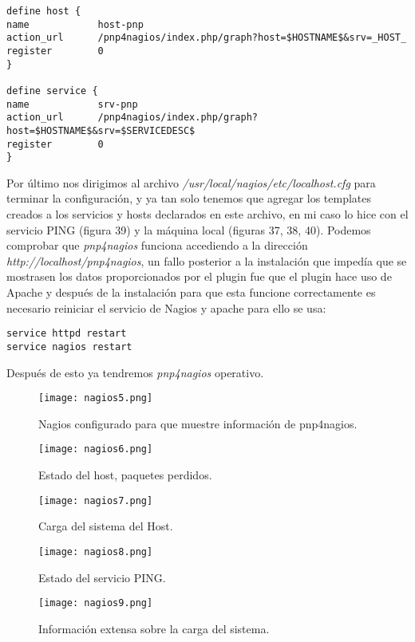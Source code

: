 \documentclass[a4paper, 11pt]{article} %
\begin{document}
\begin{verbatim}
define host {
name            host-pnp
action_url      /pnp4nagios/index.php/graph?host=$HOSTNAME$&srv=_HOST_
register        0
}

define service {
name            srv-pnp
action_url      /pnp4nagios/index.php/graph?host=$HOSTNAME$&srv=$SERVICEDESC$
register        0
}
\end{verbatim}
Por último nos dirigimos al archivo \textit{/usr/local/nagios/etc/localhost.cfg} para terminar la configuración, y ya tan solo tenemos que agregar los templates creados a los servicios y hosts declarados en este archivo, en mi caso lo hice con el servicio PING (figura 39) y la máquina local (figuras 37, 38, 40). Podemos comprobar que \textit{pnp4nagios} funciona accediendo a la dirección \textit{http://localhost/pnp4nagios}, un fallo posterior a la instalación que impedía que se mostrasen los datos proporcionados por el plugin fue que el plugin hace uso de Apache y después de la instalación para que esta funcione correctamente es necesario reiniciar el servicio de Nagios y apache para ello se usa:
\begin{verbatim}
service httpd restart
service nagios restart
\end{verbatim}
Después de esto ya tendremos \textit{pnp4nagios} operativo.
\begin{figure}[H]
\centering 
\texttt{[image: nagios5.png]} 
\caption{Nagios configurado para que muestre información de pnp4nagios.} 
\label{contexto:figura} 
\end{figure}
\begin{figure}[H]
\centering 
\texttt{[image: nagios6.png]} 
\caption{Estado del host, paquetes perdidos.} 
\label{contexto:figura} 
\end{figure}
\begin{figure}[H]
\centering 
\texttt{[image: nagios7.png]} 
\caption{Carga del sistema del Host.} 
\label{contexto:figura} 
\end{figure}
\begin{figure}[H]
\centering 
\texttt{[image: nagios8.png]} 
\caption{Estado del servicio PING.} 
\label{contexto:figura} 
\end{figure}
\begin{figure}[H]
\centering 
\texttt{[image: nagios9.png]} 
\caption{Información extensa sobre la carga del sistema.} 
\label{contexto:figura} 
\end{figure}
\end{document}
